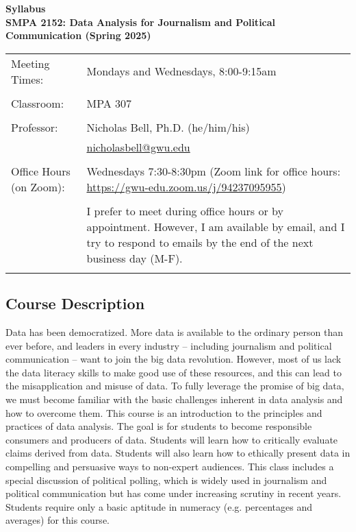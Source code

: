 \documentclass[12pt,letterpaper]{article}
\begin{document}
\begin{center}
\large
\textbf{Syllabus\\
\bigskip
SMPA 2152: Data Analysis for Journalism and Political Communication (Spring 2025)}
\end{center}

\begin{tabularx}{\textwidth}{l>{\raggedright\arraybackslash}X}
Meeting Times: & Mondays and Wednesdays, 8:00-9:15am \\
\\
Classroom: & MPA 307 \\
\\
Professor: & Nicholas Bell, Ph.D. (he/him/his) \\
& \href{mailto:nicholasbell@gwu.edu}{nicholasbell@gwu.edu} \\
\\
Office Hours (on Zoom): & Wednesdays 7:30-8:30pm \newline
(Zoom link for office hours: \href{https://gwu-edu.zoom.us/j/94237095955}{https://gwu-edu.zoom.us/j/94237095955})\\
\\
& I prefer to meet during office hours or by appointment. However, I am available by email, and I try to respond to emails by the end of the next business day (M-F).\\
\\
\hline
\end{tabularx}

\subsection*{Course Description}

Data has been democratized. More data is available to the ordinary person than ever before, and leaders in every industry -- including journalism and political communication -- want to join the big data revolution. However, most of us lack the data literacy skills to make good use of these resources, and this can lead to the misapplication and misuse of data. To fully leverage the promise of big data, we must become familiar with the basic challenges inherent in data analysis and how to overcome them. This course is an introduction to the principles and practices of data analysis. The goal is for students to become responsible consumers and producers of data. Students will learn how to critically evaluate claims derived from data. Students will also learn how to ethically present data in compelling and persuasive ways to non-expert audiences. This class includes a special discussion of political polling, which is widely used in journalism and political communication but has come under increasing scrutiny in recent years. Students require only a basic aptitude in numeracy (e.g. percentages and averages) for this course. \par
\end{document}
